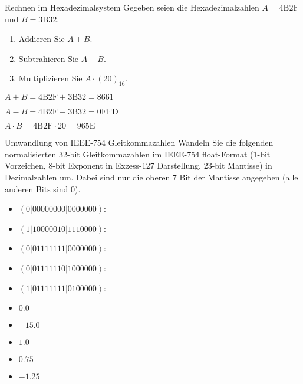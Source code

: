 \documentclass{exercisesheet}
\begin{document}
\begin{exercise*}{Rechnen im Hexadezimalsystem}
  Gegeben seien die Hexadezimalzahlen $A = \mathrm{4B2F}$ und $B = \mathrm{3B32}$.
  \begin{enumerate}
    \item Addieren Sie $A+B$.
    \item Subtrahieren Sie $A-B$.
    \item Multiplizieren Sie $A\cdot (20)_{16}$.
  \end{enumerate}
\end{exercise*}

\begin{solution}
  \item $A + B = \mathrm{4B2F} + \mathrm{3B32} = \mathrm{8661}$
  \item $A - B = \mathrm{4B2F} - \mathrm{3B32} = \mathrm{0FFD}$
  \item $A \cdot B = \mathrm{4B2F} \cdot 20 = \mathrm{965E}$
\end{solution}

\begin{exercise*}{Umwandlung von IEEE-754 Gleitkommazahlen}
  Wandeln Sie die folgenden normalisierten 32-bit Gleitkommazahlen im IEEE-754 float-Format (1-bit Vorzeichen, 8-bit Exponent in Exzess-127 Darstellung, 23-bit Mantisse) in Dezimalzahlen um. Dabei sind nur die oberen 7 Bit der Mantisse angegeben (alle anderen Bits sind 0).
  \begin{itemize}
    \item $(0|0000 0000|0000 000)$:
    \item $(1|1000 0010|1110 000)$:
    \item $(0|0111 1111|0000 000)$:
    \item $(0|0111 1110|1000 000)$:
    \item $(1|0111 1111|0100 000)$:
  \end{itemize}
\end{exercise*}

\begin{solution*}
  \begin{itemize}
    \item $0.0$
    \item $-15.0$
    \item $1.0$
    \item $0.75$
    \item $-1.25$
  \end{itemize}
\end{solution*}
\end{document}
